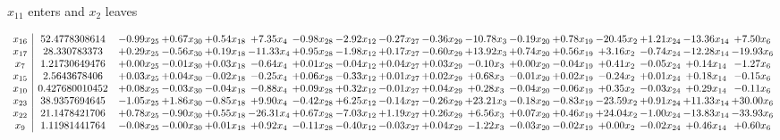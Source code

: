 \documentclass[9pt]{article}
\begin{document}
 $ x_{11} $ enters and $ x_{2} $ leaves 

 \[\begin{array}{c| c c@{\hskip 2pt} c@{\hskip 2pt} c@{\hskip 2pt} c@{\hskip 2pt} c@{\hskip 2pt} c@{\hskip 2pt} c@{\hskip 2pt} c@{\hskip 2pt} c@{\hskip 2pt} c@{\hskip 2pt} c@{\hskip 2pt} c@{\hskip 2pt} c@{\hskip 2pt} c@{\hskip 2pt} c@{\hskip 2pt} }
 x_{16}   &  52.4778308614 & -0.99 x_{25} & +  0.67 x_{30} & +  0.54 x_{18} & +  7.35 x_{4} & -0.98 x_{28} & -2.92 x_{12} & -0.27 x_{27} & -0.36 x_{29} & -10.78 x_{3} & -0.19 x_{20} & +  0.78 x_{19} & -20.45 x_{2} & +  1.21 x_{24} & -13.36 x_{14} & +  7.50 x_{6}\\
 x_{17}   &  28.330783373 & +  0.29 x_{25} & -0.56 x_{30} & +  0.19 x_{18} & -11.33 x_{4} & +  0.95 x_{28} & -1.98 x_{12} & +  0.17 x_{27} & -0.60 x_{29} & + 13.92 x_{3} & +  0.74 x_{20} & +  0.56 x_{19} & +  3.16 x_{2} & -0.74 x_{24} & -12.28 x_{14} & -19.93 x_{6}\\
 x_{7}   &  1.21730649476 & +  0.00 x_{25} & -0.01 x_{30} & +  0.03 x_{18} & -0.64 x_{4} & +  0.01 x_{28} & -0.04 x_{12} & +  0.04 x_{27} & +  0.03 x_{29} & -0.10 x_{3} & +  0.00 x_{20} & -0.04 x_{19} & +  0.41 x_{2} & -0.05 x_{24} & +  0.14 x_{14} & -1.27 x_{6}\\
 x_{15}   &  2.5643678406 & +  0.03 x_{25} & +  0.04 x_{30} & -0.02 x_{18} & -0.25 x_{4} & +  0.06 x_{28} & -0.33 x_{12} & +  0.01 x_{27} & +  0.02 x_{29} & +  0.68 x_{3} & -0.01 x_{20} & +  0.02 x_{19} & -0.24 x_{2} & +  0.01 x_{24} & +  0.18 x_{14} & -0.15 x_{6}\\
 x_{10}   &  0.427680010452 & +  0.08 x_{25} & -0.03 x_{30} & -0.04 x_{18} & -0.88 x_{4} & +  0.09 x_{28} & +  0.32 x_{12} & -0.01 x_{27} & +  0.04 x_{29} & +  0.28 x_{3} & -0.04 x_{20} & -0.06 x_{19} & +  0.35 x_{2} & -0.03 x_{24} & +  0.29 x_{14} & -0.11 x_{6}\\
 x_{23}   &  38.9357694645 & -1.05 x_{25} & +  1.86 x_{30} & -0.85 x_{18} & +  9.90 x_{4} & -0.42 x_{28} & +  6.25 x_{12} & -0.14 x_{27} & -0.26 x_{29} & + 23.21 x_{3} & -0.18 x_{20} & -0.83 x_{19} & -23.59 x_{2} & +  0.91 x_{24} & + 11.33 x_{14} & + 30.00 x_{6}\\
 x_{22}   &  21.1478421706 & +  0.78 x_{25} & -0.90 x_{30} & +  0.55 x_{18} & -26.31 x_{4} & +  0.67 x_{28} & -7.03 x_{12} & +  1.19 x_{27} & +  0.26 x_{29} & +  6.56 x_{3} & +  0.07 x_{20} & +  0.46 x_{19} & + 24.04 x_{2} & -1.00 x_{24} & -13.83 x_{14} & -33.93 x_{6}\\
 x_{9}   &  1.11981441764 & -0.08 x_{25} & -0.00 x_{30} & +  0.01 x_{18} & +  0.92 x_{4} & -0.11 x_{28} & -0.40 x_{12} & -0.03 x_{27} & +  0.04 x_{29} & -1.22 x_{3} & -0.03 x_{20} & -0.02 x_{19} & +  0.00 x_{2} & -0.02 x_{24} & +  0.46 x_{14} & +  0.60 x_{6}\\

\end{array}\]
\end{document}
